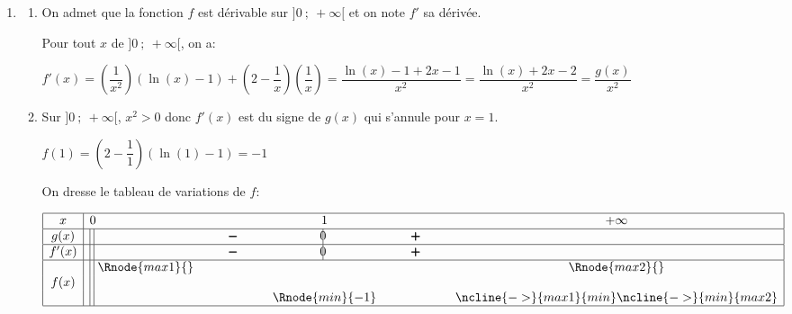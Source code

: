 \begin{enumerate}
\item 
	\begin{enumerate}
		\item On admet que la fonction $f$ est dérivable sur $]0~;~ +\infty[$ et on note $f'$ sa dérivée.


Pour tout $x$ de $]0~;~ +\infty[$, on a:

$f'(x) = \left (\dfrac{1}{x^2}\right )\left (\ln(x)-1\right ) + \left (2-\dfrac{1}{x}\right )\left (\dfrac{1}{x}\right )
= \dfrac{\ln(x)-1 +2x-1}{x^2}
= \dfrac{\ln(x)+2x-2}{x^2}
=\dfrac{g(x)}{x^2}$

		\item %
Sur $]0~;~ +\infty[$, $x^2>0$ donc $f'(x)$ est du signe de $g(x)$ qui s'annule pour $x=1$.

$f(1) = \left (2-\dfrac{1}{1}\right )\left (\ln(1)-1\right ) = -1$

On dresse le tableau de variations de $f$:

\begin{center}
{\renewcommand{\arraystretch}{1.3}
\def\esp{\hspace*{1.5cm}}%
\def\hauteur{0pt}%
$\begin{array}{|c| l *3{c} c|}
\hline
 x & 0 & \esp & 1 & \esp & +\infty \\
 \hline
g(x) & \vline\;\vline\; &  \pmb{-} & \vline\hspace{-2.7pt}0 & \pmb{+} & \\  
\hline
f'(x) &  \vline\;\vline\;  &  \pmb{-} & \vline\hspace{-2.7pt}0 & \pmb{+} & \\  
\hline
  & \vline\;\vline\;  \Rnode{max1}{}  &  &  &  & \Rnode{max2}{}   \\
f(x) & \vline\;\vline\;  &  & & &  \rule{0pt}{\hauteur} \\
 &  \vline\;\vline\;  & &   \Rnode{min}{-1} & & \rule{0pt}{\hauteur}
\ncline{->}{max1}{min} \ncline{->}{min}{max2}\\
\hline
\end{array}$
}
\end{center}		
		

\end{enumerate}
\end{enumerate}

